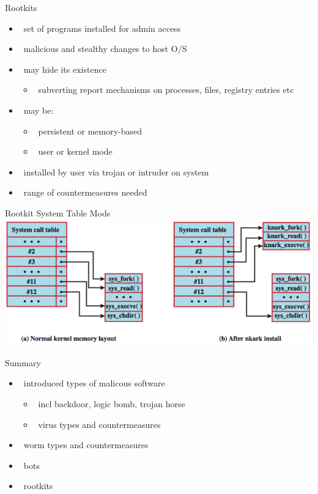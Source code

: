 \documentclass{beamer}
\begin{document}
\begin{frame}{Rootkits}
  \begin{itemize}
  \item  set of programs installed for admin access 
  \item  malicious and stealthy changes to host O/S 
  \item  may hide its existence 
    \begin{itemize}
    \item  subverting report mechanisms on processes, files, registry entries 
      etc 
    \end{itemize}
  \item  may be: 
    \begin{itemize}
    \item  persistent or memory-based 
    \item  user or kernel mode 
    \end{itemize}
  \item  installed by user via trojan or intruder on system 
  \item  range of countermeasures needed
  \end{itemize}
\end{frame}


\begin{frame}{Rootkit System Table Mods}
\includegraphics[width=0.8\linewidth]{rootkit}
\end{frame}
 
\begin{frame}{Summary}
  \begin{itemize}
  \item  introduced types of malicous software 
    \begin{itemize}
    \item  incl backdoor, logic bomb, trojan horse 
    \item  virus types and countermeasures 
    \end{itemize}
  \item  worm types and countermeasures 
  \item  bots 
  \item  rootkits
  \end{itemize}
\end{frame}
\end{document}
